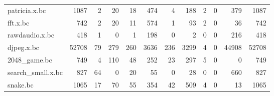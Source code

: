 \begin{table}[ht]
\begin{adjustbox}{width=1.3\textwidth}
\begin{tabular}{lrrrrrrrrrrr}
 patricia.x.bc        &                1087 &                    2 &                         20 &                   18 &                      474 &                                  4 &                           188 &                   2 &                                         0 &                                         379 &                 1087 \\
 fft.x.bc             &                 742 &                    2 &                         20 &                   11 &                      574 &                                  1 &                            93 &                   2 &                                         0 &                                          36 &                  742 \\
 rawdaudio.x.bc       &                 418 &                    1 &                          0 &                    1 &                      198 &                                  0 &                             2 &                   0 &                                         0 &                                         216 &                  418 \\
 djpeg.x.bc           &               52708 &                   79 &                        279 &                  260 &                     3636 &                                236 &                          3299 &                   4 &                                         0 &                                       44908 &                52708 \\
 2048\_game.bc         &                 749 &                    4 &                        110 &                   48 &                      252 &                                 23 &                           297 &                   5 &                                         0 &                                           0 &                  749 \\
 search\_small.x.bc    &                 827 &                   64 &                          0 &                   20 &                       55 &                                  0 &                            28 &                   0 &                                         0 &                                         660 &                  827 \\
 snake.bc             &                1065 &                   17 &                         70 &                   55 &                      354 &                                 42 &                           509 &                   4 &                                         0 &                                          13 &                 1065 \\

\end{tabular}
\end{adjustbox}
\end{table}
